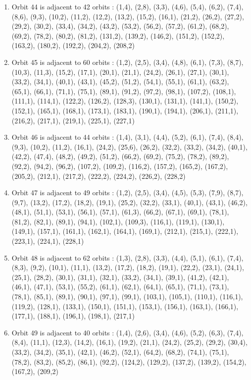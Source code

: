 \documentclass[12pt]{article}
\begin{document}
\begin{enumerate}
\item Orbit 44 is adjacent to 42 orbits : (1,4), (2,8), (3,3), (4,6), (5,4), (6,2), (7,4), (8,6), (9,3), (10,2), (11,2), (12,2), (13,2), (15,2), (16,1), (21,2), (26,2), (27,2), (29,2), (30,2), (33,4), (34,2), (43,2), (53,2), (56,2), (57,2), (61,2), (68,2), (69,2), (78,2), (80,2), (81,2), (131,2), (139,2), (146,2), (151,2), (152,2), (163,2), (180,2), (192,2), (204,2), (208,2)
\item Orbit 45 is adjacent to 60 orbits : (1,2), (2,5), (3,4), (4,8), (6,1), (7,3), (8,7), (10,3), (11,3), (15,2), (17,1), (20,1), (21,1), (24,2), (26,1), (27,1), (30,1), (33,2), (34,1), (40,1), (43,1), (45,2), (51,2), (54,1), (55,1), (61,1), (63,2), (65,1), (66,1), (71,1), (75,1), (89,1), (91,2), (97,2), (98,1), (107,2), (108,1), (111,1), (114,1), (122,2), (126,2), (128,3), (130,1), (131,1), (141,1), (150,2), (152,1), (165,1), (168,1), (173,1), (183,1), (190,1), (194,1), (206,1), (211,1), (216,2), (217,1), (219,1), (225,1), (227,1)
\item Orbit 46 is adjacent to 44 orbits : (1,4), (3,1), (4,4), (5,2), (6,1), (7,4), (8,4), (9,3), (10,2), (11,2), (16,1), (24,2), (25,6), (26,2), (32,2), (33,2), (34,2), (40,1), (42,2), (47,4), (48,2), (49,2), (51,2), (66,2), (69,2), (75,2), (78,2), (89,2), (92,2), (94,2), (96,2), (107,2), (109,2), (116,2), (157,2), (165,2), (167,2), (205,2), (212,1), (217,2), (222,2), (224,2), (226,2), (228,2)
\item Orbit 47 is adjacent to 49 orbits : (1,2), (2,5), (3,4), (4,5), (5,3), (7,9), (8,7), (9,7), (13,2), (17,2), (18,2), (19,1), (25,2), (32,2), (33,1), (40,1), (43,1), (46,2), (48,1), (51,1), (53,1), (56,1), (57,1), (61,3), (66,2), (67,1), (69,1), (78,1), (81,2), (82,1), (89,1), (94,1), (102,1), (109,3), (116,1), (119,1), (130,1), (149,1), (157,1), (161,1), (162,1), (164,1), (169,1), (212,1), (215,1), (222,1), (223,1), (224,1), (228,1)
\item Orbit 48 is adjacent to 62 orbits : (1,3), (2,8), (3,3), (4,4), (5,1), (6,1), (7,4), (8,3), (9,2), (10,1), (11,1), (13,2), (17,2), (18,2), (19,1), (22,2), (23,1), (24,1), (25,1), (28,2), (30,1), (31,1), (32,1), (33,2), (34,1), (39,1), (41,2), (42,1), (46,1), (47,1), (53,1), (55,2), (61,1), (62,1), (64,1), (65,1), (71,1), (73,1), (78,1), (85,1), (89,1), (90,1), (97,1), (99,1), (103,1), (105,1), (110,1), (116,1), (119,2), (128,1), (133,1), (150,1), (151,1), (153,1), (156,1), (163,1), (166,1), (177,1), (188,1), (196,1), (198,1), (217,1)
\item Orbit 49 is adjacent to 40 orbits : (1,4), (2,6), (3,4), (4,6), (5,2), (6,3), (7,4), (8,4), (11,1), (12,3), (14,2), (16,1), (19,2), (21,1), (24,2), (25,2), (29,2), (30,4), (33,2), (34,2), (35,1), (42,1), (46,2), (52,1), (64,2), (68,2), (74,1), (75,1), (78,2), (83,2), (85,2), (86,1), (92,2), (124,2), (129,2), (137,2), (139,2), (154,2), (167,2), (209,2)

\end{enumerate}
\end{document}
